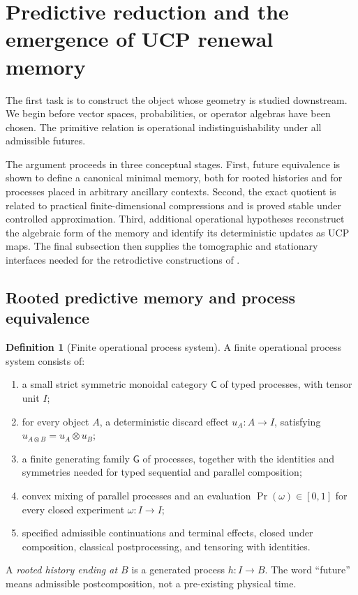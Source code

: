 \documentclass[11pt]{article}
\theoremstyle{definition}
\newtheorem{definition}[theorem]{Definition}
\theoremstyle{remark}
\begin{document}
\section{Predictive reduction and the emergence of UCP renewal memory}
\label{sec:predictive}

The first task is to construct the object whose geometry is studied
downstream.  We begin before vector spaces, probabilities, or operator
algebras have been chosen.  The primitive relation is operational
indistinguishability under all admissible futures.

The argument proceeds in three conceptual stages.  First, future equivalence is
shown to define a canonical minimal memory, both for rooted histories and for
processes placed in arbitrary ancillary contexts.  Second, the exact quotient is
related to practical finite-dimensional compressions and is proved stable under
controlled approximation.  Third, additional operational hypotheses reconstruct
the algebraic form of the memory and identify its deterministic updates as UCP
maps.  The final subsection then supplies the tomographic and stationary
interfaces needed for the retrodictive constructions of .

\subsection{Rooted predictive memory and process equivalence}
\label{subsec:rooted-and-process}

\begin{definition}[Finite operational process system]
\label{def:process-system}
A finite operational process system consists of:
\begin{enumerate}[label=\textup{(\roman*)},leftmargin=2.4em]
\item a small strict symmetric monoidal category $\mathsf C$ of typed processes,
      with tensor unit $I$;
\item for every object $A$, a deterministic discard effect
      $u_A:A\to I$, satisfying $u_{A\otimes B}=u_A\otimes u_B$;
\item a finite generating family $\mathsf G$ of processes, together with the
      identities and symmetries needed for typed sequential and parallel
      composition;
\item convex mixing of parallel processes and an evaluation
      $\Pr(\omega)\in[0,1]$ for every closed experiment $\omega:I\to I$;
\item specified admissible continuations and terminal effects, closed under
      composition, classical postprocessing, and tensoring with identities.
\end{enumerate}
A \emph{rooted history ending at $B$} is a generated process $h:I\to B$.
The word ``future'' means admissible postcomposition, not a pre-existing
physical time.
\end{definition}
\end{document}
